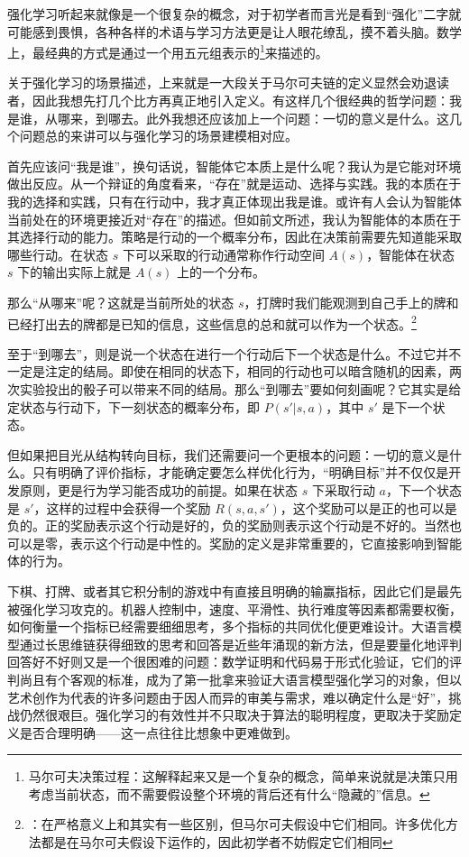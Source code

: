 强化学习听起来就像是一个很复杂的概念，对于初学者而言光是看到“强化”二字就可能感到畏惧，各种各样的术语与学习方法更是让人眼花缭乱，摸不着头脑。数学上，最经典的方式是通过一个用五元组表示的\footnote{马尔可夫决策过程：这解释起来又是一个复杂的概念，简单来说就是决策只用考虑当前状态，而不需要假设整个环境的背后还有什么“隐藏的”信息。}来描述的。

关于强化学习的场景描述，上来就是一大段关于马尔可夫链的定义显然会劝退读者，因此我想先打几个比方再真正地引入定义。有这样几个很经典的哲学问题：我是谁，从哪来，到哪去。此外我想还应该加上一个问题：一切的意义是什么。这几个问题总的来讲可以与强化学习的场景建模相对应。

首先应该问“我是谁”，换句话说，智能体它本质上是什么呢？我认为是它能对环境做出反应。从一个辩证的角度看来，“存在”就是运动、选择与实践。我的本质在于我的选择和实践，只有在行动中，我才真正体现出我是谁。或许有人会认为智能体当前处在的环境更接近对“存在”的描述。但如前文所述，我认为智能体的本质在于其选择行动的能力。策略是行动的一个概率分布，因此在决策前需要先知道能采取哪些行动。在状态 $s$ 下可以采取的行动通常称作行动空间 $A(s)$，智能体在状态 $s$ 下的输出实际上就是 $A(s)$ 上的一个分布。

那么“从哪来”呢？这就是当前所处的状态 $s$，打牌时我们能观测到自己手上的牌和已经打出去的牌都是已知的信息，这些信息的总和就可以作为一个状态。\footnote{：在严格意义上和其实有一些区别，但马尔可夫假设中它们相同。许多优化方法都是在马尔可夫假设下运作的，因此初学者不妨假定它们相同}

至于“到哪去”，则是说一个状态在进行一个行动后下一个状态是什么。不过它并不一定是注定的结局。即使在相同的状态下，相同的行动也可以暗含随机的因素，两次实验投出的骰子可以带来不同的结局。那么“到哪去”要如何刻画呢？它其实是给定状态与行动下，下一刻状态的概率分布，即 $P(s'|s,a)$，其中 $s'$ 是下一个状态。

但如果把目光从结构转向目标，我们还需要问一个更根本的问题：一切的意义是什么。只有明确了评价指标，才能确定要怎么样优化行为，“明确目标”并不仅仅是开发原则，更是行为学习能否成功的前提。如果在状态 $s$ 下采取行动 $a$，下一个状态是 $s'$，这样的过程中会获得一个奖励 $R(s,a,s')$，这个奖励可以是正的也可以是负的。正的奖励表示这个行动是好的，负的奖励则表示这个行动是不好的。当然也可以是零，表示这个行动是中性的。奖励的定义是非常重要的，它直接影响到智能体的行为。

下棋、打牌、或者其它积分制的游戏中有直接且明确的输赢指标，因此它们是最先被强化学习攻克的。机器人控制中，速度、平滑性、执行难度等因素都需要权衡，如何衡量一个指标已经需要细细思考，多个指标的共同优化便更难设计。大语言模型通过长思维链获得细致的思考和回答是近些年涌现的新方法，但是要量化地评判回答好不好则又是一个很困难的问题：数学证明和代码易于形式化验证，它们的评判尚且有个客观的标准，成为了第一批拿来验证大语言模型强化学习的对象，但以艺术创作为代表的许多问题由于因人而异的审美与需求，难以确定什么是“好”，挑战仍然很艰巨。强化学习的有效性并不只取决于算法的聪明程度，更取决于奖励定义是否合理明确——这一点往往比想象中更难做到。

